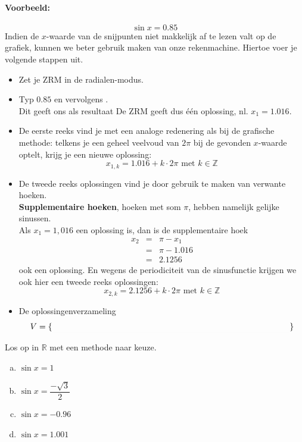 \documentclass[a4paper,12pt,twoside]{article}
\begin{document}
\paragraph*{Voorbeeld:}
$$\sin x = 0.85$$
Indien de $x$-waarde van de snijpunten niet makkelijk af te lezen valt op de grafiek, kunnen we beter gebruik maken van onze rekenmachine.
Hiertoe voer je volgende stappen uit.
\begin{itemize}
  \item Zet je ZRM in de radialen-modus.
  \item Typ $0.85$ en vervolgens  .\\
  Dit geeft ons als resultaat \arulefill
  De ZRM geeft dus één oplossing, nl. $x_{1}=1.016$.
  \item De eerste reeks vind je met een analoge redenering als bij de grafische methode: telkens je een geheel veelvoud van $2\pi$ bij de gevonden $x$-waarde optelt, krijg je een nieuwe oplossing:
  $$x_{1,k}=1.016+k\cdot2\pi \mbox{ met } k \in \mathbb{Z}$$
  \item De tweede reeks oplossingen vind je door gebruik te maken van verwante hoeken.\\
  {\bf Supplementaire hoeken}, hoeken met som $\pi$, hebben namelijk gelijke sinussen.\\
  Als $x_{1}=1,016$ een oplossing is, dan is de supplementaire hoek
  \begin{eqnarray*}
  x_2 &=& \pi -x_{1}\\
      &=& \pi - 1.016\\
      &=& 2.1256
  \end{eqnarray*}
  ook een oplossing. En wegens de periodiciteit van de sinusfunctie krijgen we ook hier een tweede reeks oplossingen:
  $$x_{2,k} = 2.1256+k\cdot2\pi \mbox{ met } k \in \mathbb{Z}$$
  \item De oplossingenverzameling $$V = \{\arule{10cm}\}$$
\end{itemize}

\begin{oefening}
Los op in $\mathbb{R}$ met een methode naar keuze.
\begin{enumerate}[(a)]
  \item $\sin x=1$
  \item $\sin x=\dfrac{-\sqrt{3}}{2}$
  \item $\sin x=-0.96$
  \item $\sin x=1.001$
\end{enumerate}
\end{oefening}
\end{document}
